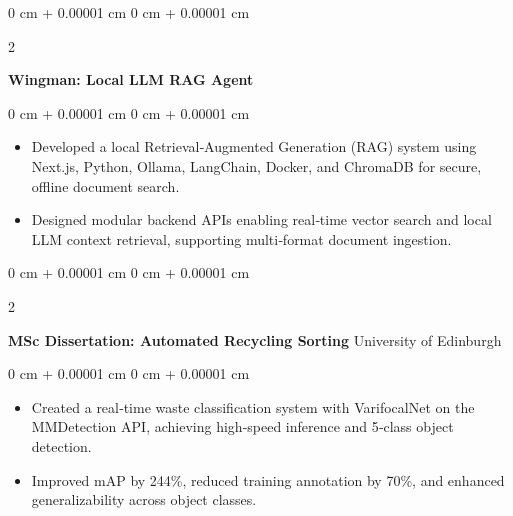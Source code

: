 \documentclass[10pt, letterpaper]{article}
\newenvironment{highlights}{
    \begin{itemize}[
        topsep=0.10 cm,
        parsep=0.10 cm,
        partopsep=0pt,
        itemsep=0pt,
        leftmargin=0 cm + 10pt
    ]
}{
    \end{itemize}
} %
\newenvironment{onecolentry}{
    \begin{adjustwidth}{
        0 cm + 0.00001 cm
    }{
        0 cm + 0.00001 cm
    }
}{
    \end{adjustwidth}
} %
\newenvironment{twocolentry}[2][]{
    \onecolentry
    \def\secondColumn{#2}
    \setcolumnwidth{\fill, 4.5 cm}
    \begin{paracol}{2}
}{
    \switchcolumn \raggedleft \secondColumn
    \end{paracol}
    \endonecolentry
} %
\begin{document}
        \vspace{0.2 cm}

        \begin{twocolentry}{
        
        }
            \textbf{Wingman: Local LLM RAG Agent}\end{twocolentry}
        \vspace{0.10 cm}
        \begin{onecolentry}
            \begin{highlights}
                \item Developed a local Retrieval‑Augmented Generation (RAG) system using Next.js, Python, Ollama, LangChain, Docker, and ChromaDB for secure, offline document search.
                \item Designed modular backend APIs enabling real‑time vector search and local LLM context retrieval, supporting multi‑format document ingestion.
            \end{highlights}
        \end{onecolentry}

        \vspace{0.2 cm}

        \begin{twocolentry}{
        University of Edinburgh
        }
            \textbf{MSc Dissertation: Automated Recycling Sorting}\end{twocolentry}

        \vspace{0.10 cm}
        \begin{onecolentry}
            \begin{highlights}
                \item Created a real‑time waste classification system with VarifocalNet on the MMDetection API, achieving high‑speed inference and 5‑class object detection.
                \item Improved mAP by 244\%, reduced training annotation by 70\%, and enhanced generalizability across object classes.
            \end{highlights}
        \end{onecolentry}

        \vspace{0.2 cm}

\end{document}
